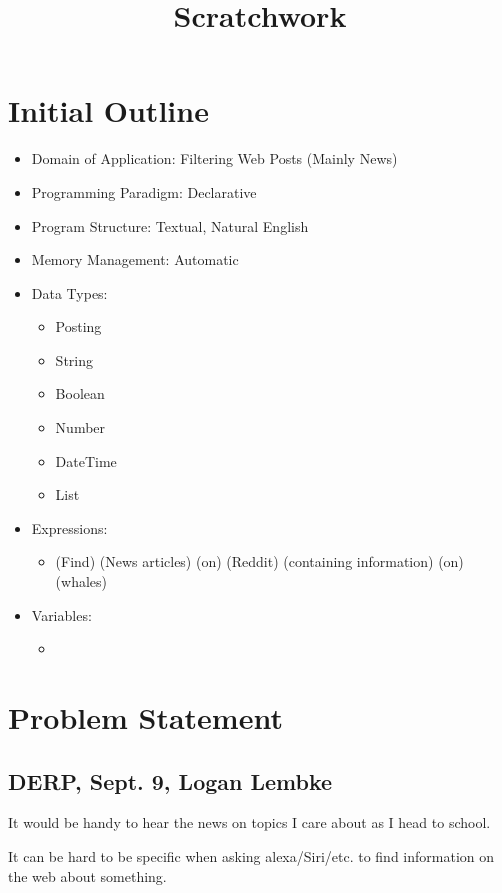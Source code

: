 \documentclass{article}
\title{Scratchwork}
\begin{document}
\maketitle
\section{Initial Outline}
\begin{itemize}
    \item Domain of Application: Filtering Web Posts (Mainly News)
    \item Programming Paradigm: Declarative
    \item Program Structure: Textual, Natural English
    \item Memory Management: Automatic
    \item Data Types: 
    \begin{itemize}
        \item Posting
        \item String
        \item Boolean
        \item Number
        \item DateTime
        \item List
    \end{itemize}
    \item Expressions:
    \begin{itemize}
        \item (Find) (News articles) (on) (Reddit) (containing information) (on) (whales)
    \end{itemize}
    \item Variables:
    \begin{itemize}
        \item 
    \end{itemize}
\end{itemize}

\section{Problem Statement}

\subsection{DERP, Sept. 9, Logan Lembke}
It would be handy to hear the news on topics I care about as I head to school.

It can be hard to be specific when asking alexa/Siri/etc. to find information on the web about something. 
\end{document}
